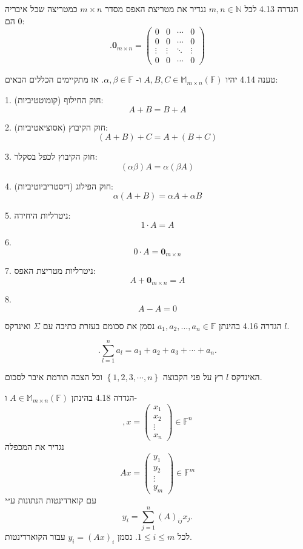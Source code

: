 \documentclass[a4paper, 11pt]{article}
\newcommand{\Set}[1]{\left\{#1\right\}}
\begin{document}
\begin{envbox}[defcolor]{הגדרה 4.13}
לכל $m,n\in\mathbb{N}$ נגדיר את מטריצת האפס מסדר $m\times n$ כמטריצה שכל איבריה הם $0$: 
\[
.\mathbf{0}_{m\times n}=\begin{pmatrix}0 &0 &\cdots &0 \\
0 &0 &\cdots &0 \\
\vdots & \vdots &\ddots &\vdots\\
0 &0 &\cdots &0
\end{pmatrix}
\]
\end{envbox}

\begin{envbox}[thmcolor]{טענה 4.14}
יהיו $A,B,C\in\mathbb{M}_{m\times n}(\mathbb{F})$ ו- $\alpha,\beta\in\mathbb{F}$. אז מתקיימים הכללים הבאים:

1.  חוק החילוף (קומוטטיביות): 
\[
A+B=B+A
\]

2.  חוק הקיבוץ (אסוציאטיביות): 
\[
(A+B)+C=A+(B+C)
\]

3.  חוק הקיבוץ לכפל בסקלר: 
\[
(\alpha\beta)A=\alpha(\beta A)
\]

4.  חוק הפילוג (דיסטריביוטיביות): 
\[
\alpha(A+B)=\alpha A+\alpha B
\]

5.  ניטרליות היחידה: 
\[
1\cdot A=A
\]

6.  
\[
0\cdot A=\mathbf{0}_{m\times n}
\]

7.  ניטרליות מטריצת האפס: 
\[
A+\mathbf{0}_{m\times n}=A
\]

8.  
\[
A-A=0
\]
\end{envbox}

\begin{envbox}[defcolor]{הגדרה 4.16}
בהינתן $a_1,a_2,...,a_n\in\mathbb{F}$ נסמן את סכומם בעזרת כתיבה עם $\Sigma$ ואינדקס $l$.

\[
.\sum_{l=1}^n a_l=a_1+a_2+a_3+\cdots+a_n.
\]

האינדקס $l$ רץ על פני הקבוצה $\Set{1,2,3,\cdots,n}$ וכל הצבה תורמת איבר לסכום.
\end{envbox}

\begin{envbox}[defcolor]{הגדרה 4.18}
בהינתן $A\in\mathbb{M}_{m\times n}(\mathbb{F})$ ו- 
\[
,x=\begin{pmatrix}
x_1\\
x_2\\
\vdots \\
x_n
\end{pmatrix}\in\mathbb{F}^n
\]
 נגדיר את המכפלה 
\[
Ax=\begin{pmatrix}
y_1\\
y_2\\
\vdots \\
y_m
\end{pmatrix}\in\mathbb{F}^m
\]
 עם קוארדינטות הנתונות ע״י 
\[
y_i=\sum_{j=1}^n (A)_{ij}x_j.
\]
 לכל $1\leq i\leq m$. נסמן $y_i=(Ax)_i$ עבור הקוארדינטות.
\end{envbox}
\end{document}
